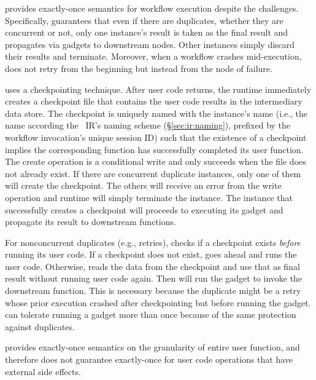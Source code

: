 \name{} provides exactly-once semantics for workflow execution despite the
challenges. Specifically, \name{} guarantees that even if there are
duplicates, whether they are concurrent or not, only one instance's result is
taken as the final result and propagates via gadgets to downstream nodes.
Other instances simply discard their results and terminate. Moreover, when a
workflow crashes mid-execution, \name{} does not retry from the beginning but
instead from the node of failure.

\name{} uses a checkpointing technique. After user code returns, the \name{}
runtime immediately creates a checkpoint file that contains the user code
results in the intermediary data store. The checkpoint is uniquely named with
the instance's name (i.e., the name according the
\name{}~IR's naming scheme (\S\ref{sec:ir:naming}), prefixed by the workflow
invocation's unique session ID) such that the existence of a checkpoint
implies the corresponding function has successfully completed its user
function. The create operation is a conditional write and only succeeds when
the file does not already exist. If there are concurrent duplicate instances,
only one of them will create the checkpoint. The others will receive an error
from the write operation and \name{} runtime will simply terminate the
instance. The instance that successfully creates a checkpoint will proceeds to
executing its gadget and propagate its result to downstream functions.


For nonconcurrent duplicates (e.g., retries), \name{} checks if a checkpoint
exists \emph{before} running its user code. If a checkpoint does not exist,
\name{} goes ahead and runs the user code. Otherwise, \name{} reads the data
from the checkpoint and use that as final result without running user code
again. Then \name{} will run the gadget to invoke the downstream function.
This is necessary because the duplicate might be a retry whose prior execution
crashed after checkpointing but before running the gadget. \name{} can
tolerate running a gadget more than once because of the same protection
against duplicates.

\name{} provides exactly-once semantics on the granularity of entire user
function, and therefore does not guarantee exactly-once for user code
operations that have external side effects.


